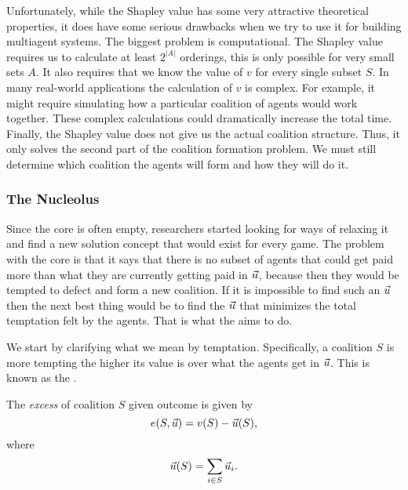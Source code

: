 
Unfortunately, while the Shapley value has some very attractive
theoretical properties, it does have some serious drawbacks when we
try to use it for building multiagent systems. The biggest problem is
computational. The Shapley value requires us to calculate at least
$2^{|A|}$ orderings, this is only possible for very small sets $A$. It
also requires that we know the value of $v$ for every single subset
$S$.  In many real-world applications the calculation of $v$ is
complex. For example, it might require simulating how a particular
coalition of agents would work together. These complex calculations
could dramatically increase the total time. Finally, the Shapley value
does not give us the actual coalition structure. Thus, it only solves
the second part of the coalition formation problem. We must still
determine which coalition the agents will form and how they will do
it.

\subsubsection{The Nucleolus}
\label{sec:nucleolus}

Since the core is often empty, researchers started looking for ways of
relaxing it and find a new solution concept that would exist for every
game. The problem with the core is that it says that there is no
subset of agents that could get paid more than what they are currently
getting paid in $\vec{u}$, because then they would be tempted to
defect and form a new coalition. If it is impossible to find such an
$\vec{u}$ then the next best thing would be to find the
$\vec{u}$ that minimizes the total temptation felt by the agents.
That is what the  aims to do.

We start by clarifying what we mean by temptation. Specifically, a
coalition $S$ is more tempting the higher its value is over what the
agents get in $\vec{u}$. This is known as the .
\begin{definition}[excess]
  The \emph{excess} of coalition $S$ given outcome \vu{} is
  given by 
  \[e(S,\vec{u}) = v(S) - \vec{u}(S), \]
  where 
  \[\vec{u}(S) = \sum_{i\in S} \vec{u}_i.\]
\end{definition}

